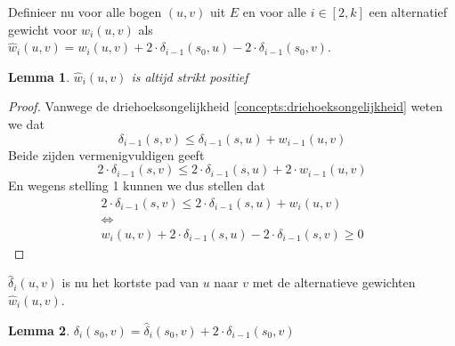 \documentclass[conference]{IEEEtran}
\newtheorem{lemma}{Lemma}[section]
\theoremstyle{definition}
\begin{document}
Definieer nu voor alle bogen $(u, v)$ uit $E$ en voor alle $i \in [2, k]$ een alternatief gewicht voor $w_i(u, v)$ als $\hat{w}_i(u, v) = w_i(u, v) + 2 \cdot \delta_{i-1}(s_0, u) - 2 \cdot \delta_{i-1}(s_0, v)$.
\begin{lemma}
    $\hat{w}_i(u, v)$ is altijd strikt positief
\end{lemma}

\begin{proof}
    Vanwege de driehoeksongelijkheid \ref{concepts:driehoeksongelijkheid} weten we dat
    \begin{displaymath}
        \delta_{i-1}(s, v) \leq \delta_{i-1}(s, u) + w_{i-1}(u, v)
    \end{displaymath}
    Beide zijden vermenigvuldigen geeft
    \begin{displaymath}
        2 \cdot \delta_{i-1}(s, v) \leq 2 \cdot \delta_{i-1}(s, u) + 2 \cdot w_{i-1}(u, v)
    \end{displaymath}
    En wegens stelling 1 kunnen we dus stellen dat
    \begin{gather*}
        2 \cdot \delta_{i-1}(s, v) \leq 2 \cdot \delta_{i-1}(s, u) + w_i(u, v)\\
        \Leftrightarrow\\
        w_i(u, v) + 2 \cdot \delta_{i-1}(s, u) - 2 \cdot \delta_{i-1}(s, v) \geq 0
    \end{gather*}
\end{proof}


$\hat{\delta}_i(u, v)$ is nu het kortste pad van $u$ naar $v$ met de alternatieve gewichten $\hat{w}_i(u, v)$.
\begin{lemma} \label{theorem:deltaI}
    $\delta_i(s_0, v) = \hat{\delta}_i(s_0, v) + 2 \cdot \delta_{i-1}(s_0, v)$
\end{lemma}
\end{document}
